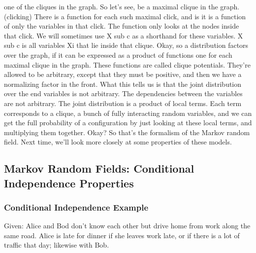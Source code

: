 \documentclass{article}
\begin{document}
\begin{flushleft}
one of the cliques in the graph. So let's see, be a maximal clique in the graph. (clicking) There is a function for each such maximal click, and is it is a function of only the variables in that click. The function only looks at the nodes inside that click. We will sometimes use X sub c as a shorthand for these variables. X sub c is all variables Xi that lie inside that clique. Okay, so a distribution factors over the graph, if it can be expressed as a product of functions one for each maximal clique in the graph. These functions are called clique potentials. They're allowed to be arbitrary, except that they must be positive, and then we have a normalizing factor in the front. What this tells us is that the joint distribution over the end variables is not arbitrary. The dependencies between the variables are not arbitrary. The joint distribution is a product of local terms. Each term corresponds to a clique, a bunch of fully interacting random variables, and we can get the full probability of a configuration by just looking at these local terms, and multiplying them together. Okay? So that's the formalism of the Markov random field. Next time, we'll look more closely at some properties of these models. 
\end{flushleft}


\subsection{Markov Random Fields: Conditional Independence Properties}
\subsubsection{Conditional Independence Example}
\begin{flushleft}
    Given: Alice and Bod don't know each other but drive home from work along the same road. Alice is late for dinner if she leaves work late, or if there is a lot of traffic that day; likewise with Bob.
\end{flushleft}
\end{document}

